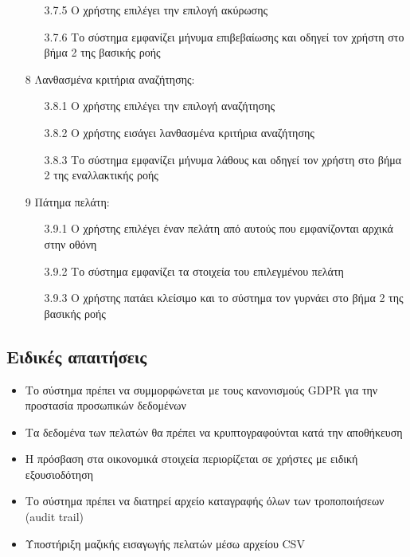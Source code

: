 \documentclass[12pt,a4paper,twoside]{book}
\begin{document}
\begin{enumerate}
\begin{enumerate}
          \item[3.7.5 ] Ο χρήστης επιλέγει την επιλογή ακύρωσης
          \item[3.7.6 ] Το σύστημα εμφανίζει μήνυμα επιβεβαίωσης και οδηγεί τον χρήστη στο βήμα 2 της βασικής ροής %
        \end{enumerate}
  \item[8 ] Λανθασμένα κριτήρια αναζήτησης:
        \begin{enumerate}
          \item[3.8.1 ] Ο χρήστης επιλέγει την επιλογή αναζήτησης
          \item[3.8.2 ] Ο χρήστης εισάγει λανθασμένα κριτήρια αναζήτησης
          \item[3.8.3 ] Το σύστημα εμφανίζει μήνυμα λάθους και οδηγεί τον χρήστη στο βήμα 2 της εναλλακτικής ροής %
        \end{enumerate}
  \item[9 ] Πάτημα πελάτη:
        \begin{enumerate}
          \item[3.9.1 ] Ο χρήστης επιλέγει έναν πελάτη από αυτούς που εμφανίζονται αρχικά στην οθόνη
          \item[3.9.2 ] Το σύστημα εμφανίζει τα στοιχεία του επιλεγμένου πελάτη
          \item[3.9.3 ] Ο χρήστης πατάει κλείσιμο και το σύστημα τον γυρνάει στο βήμα 2 της βασικής ροής
        \end{enumerate}
\end{enumerate}

\subsection{Ειδικές απαιτήσεις} %
\begin{itemize}
  \item Το σύστημα πρέπει να συμμορφώνεται με τους κανονισμούς GDPR για την προστασία προσωπικών δεδομένων %
  \item Τα δεδομένα των πελατών θα πρέπει να κρυπτογραφούνται κατά την αποθήκευση %
  \item Η πρόσβαση στα οικονομικά στοιχεία περιορίζεται σε χρήστες με ειδική εξουσιοδότηση %
  \item Το σύστημα πρέπει να διατηρεί αρχείο καταγραφής όλων των τροποποιήσεων (audit trail) %
  \item Υποστήριξη μαζικής εισαγωγής πελατών μέσω αρχείου CSV
\end{itemize}
\end{document}
